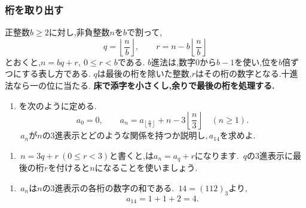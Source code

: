   \subsubsection{桁を取り出す}\label{節：ガウス型の桁の抽出}
    正整数$b\ge2$に対し,非負整数$n$を$b$で割って,
    \[
      q=\left\lfloor\frac nb\right\rfloor,
      \qquad r=n-b\left\lfloor\frac nb\right\rfloor
    \]
    とおくと,$n=bq+r,\ 0\le r<b$である.
    $b$進法は,数字0から$b-1$を使い,位を$b$倍ずつにする表し方である.
    $q$は最後の桁を除いた整数,$r$はその桁の数字となる.十進法なら一の位に当たる.
    \textbf{床で添字を小さくし,余りで最後の桁を処理する.}

    \noindent {}\par\nobreak
    \begin{enumerate}[label=(\arabic*),parsep=3pt,beginpenalty=10000,format=\bookitemlink{example-gauss-role-8}{problem}{answer}]
      \item {}を次のように定める.
            \[
              a_0=0,\qquad
              a_n=a_{\left\lfloor\frac n3\right\rfloor}
                  +n-3\left\lfloor\frac n3\right\rfloor
              \quad(n\ge1).
            \]
            \,$a_n$が$n$の3進表示とどのような関係を持つか説明し,\,$a_{14}$を求めよ.
    \end{enumerate}

    \noindent {}\par\nobreak
    \begin{enumerate}[label=(\arabic*),parsep=3pt,beginpenalty=10000,format=\bookitemlink{example-gauss-role-8}{hint}{problem}]
      \item \,$n=3q+r\ (0\le r<3)$と書くと,は$a_n=a_q+r$になります.
            \,$q$の3進表示に最後の桁$r$を付けると$n$になることを使いましょう.
    \end{enumerate}

    \noindent {}\par\nobreak
    \begin{enumerate}[label=(\arabic*),parsep=3pt,beginpenalty=10000,format=\bookitemlink{example-gauss-role-8}{answer}{problem}]
      \item \,$a_n$は$n$の3進表示の各桁の数字の和である.
            \,$14=(112)_3$より,
            \[
              a_{14}=1+1+2=4.
            \]
    \end{enumerate}

